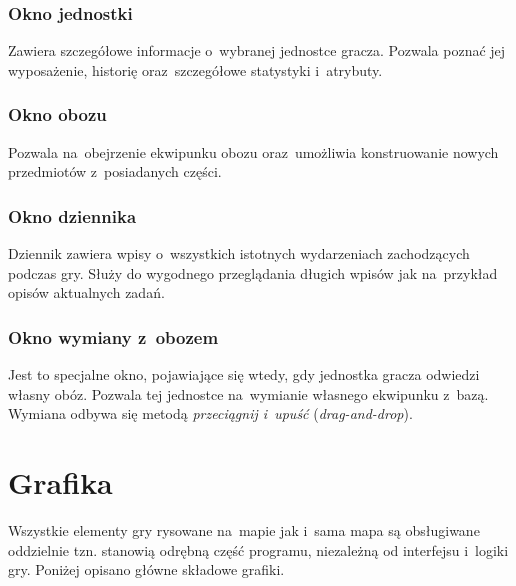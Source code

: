 \documentclass[licencjacka]{pracamgr}
\begin{document}
      \subsubsection{Okno jednostki}
	Zawiera szczegółowe informacje o~wybranej jednostce gracza. Pozwala poznać jej wyposażenie, historię oraz~szczegółowe statystyki i~atrybuty.
      \subsubsection{Okno obozu}
	Pozwala na~obejrzenie ekwipunku obozu oraz~umożliwia konstruowanie nowych przedmiotów z~posiadanych części.
      \subsubsection{Okno dziennika}
	Dziennik zawiera wpisy o~wszystkich istotnych wydarzeniach zachodzących podczas gry. Służy do wygodnego przeglądania długich wpisów jak na~przykład
	opisów aktualnych zadań.
      \subsubsection{Okno wymiany z~obozem}
	Jest to specjalne okno, pojawiające się wtedy, gdy jednostka gracza odwiedzi własny obóz. Pozwala tej jednostce na~wymianie własnego ekwipunku z~bazą.
	Wymiana odbywa się metodą \emph{przeciągnij i~upuść} (\emph{drag-and-drop}).


  \section{Grafika}
    Wszystkie elementy gry rysowane na~mapie jak i~sama mapa są obsługiwane oddzielnie tzn. stanowią odrębną część programu, niezależną od interfejsu i~logiki gry.
    Poniżej opisano główne składowe grafiki.
\end{document}
